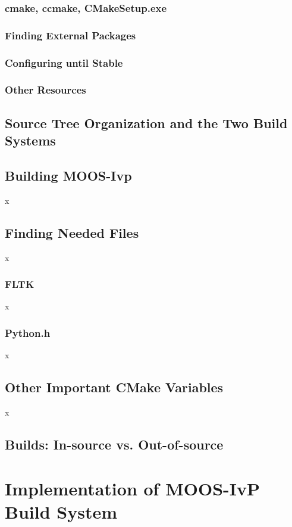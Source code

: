 \documentclass[letterpaper,10pt]{article}
\begin{document}
\subsubsection{cmake, ccmake, CMakeSetup.exe}
\subsubsection{Finding External Packages}
\subsubsection{Configuring until Stable}
\subsubsection{Other Resources}

\subsection{Source Tree Organization and the Two Build Systems}

\subsection{Building MOOS-Ivp}
x

\subsection{Finding Needed Files}
x

\subsubsection{FLTK}
x

\subsubsection{Python.h}
x

\subsection{Other Important CMake Variables}
x
\subsection{Builds: In-source vs. Out-of-source}

\section{Implementation of MOOS-IvP Build System }
\end{document}
